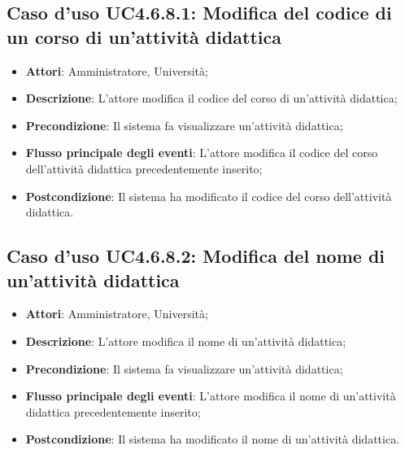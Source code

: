 \subsection{Caso d'uso \texorpdfstring{UC4.6.8.1}{UC4.6.8.1}: Modifica del codice di un corso di un'attività didattica}
\begin{itemize}
\item \textbf{Attori}: Amministratore, Università;
\item \textbf{Descrizione}: L'attore modifica il codice del corso di un'attività didattica;

\item \textbf{Precondizione}: Il sistema fa visualizzare un'attività didattica;

\item \textbf{Flusso principale degli eventi}: L'attore modifica il codice del corso dell’attività didattica precedentemente inserito;

\item \textbf{Postcondizione}: Il sistema ha modificato il codice del corso dell’attività didattica.

\end{itemize}
\subsection{Caso d'uso \texorpdfstring{UC4.6.8.2}{UC4.6.8.2}: Modifica del nome di un'attività didattica}
\begin{itemize}
\item \textbf{Attori}: Amministratore, Università;
\item \textbf{Descrizione}: L'attore modifica il nome di un'attività didattica;

\item \textbf{Precondizione}: Il sistema fa visualizzare un'attività didattica;


\item \textbf{Flusso principale degli eventi}: L'attore modifica il nome di un'attività didattica precedentemente inserito;

\item \textbf{Postcondizione}: Il sistema ha modificato il nome di un'attività didattica.

\end{itemize}
